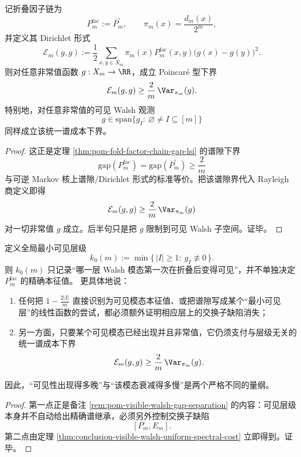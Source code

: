 \begin{theorem}[可见模态的统一谱成本下界]\label{thm:conclusion-visible-walsh-uniform-spectral-cost}
记折叠因子链为
\[
P_m^{\mathrm{fac}}:=\overline P_m^\square,
\qquad
\pi_m(x)=\frac{d_m(x)}{2^m},
\]
并定义其 Dirichlet 形式
\[
\mathcal E_m(g,g)
:=
\frac12\sum_{x,y\in X_m}\pi_m(x)P_m^{\mathrm{fac}}(x,y)\bigl(g(x)-g(y)\bigr)^2.
\]
则对任意非常值函数 \(g:X_m\to\RR\)，成立 Poincar\'e 型下界
\[
\mathcal E_m(g,g)\ge \frac{2}{m}\,\Var_{\pi_m}(g).
\]
特别地，对任意非常值的可见 Walsh 观测
\[
g\in \mathrm{span}\{g_I:\ \varnothing\neq I\subseteq[m]\}
\]
同样成立该统一谱成本下界。
\end{theorem}

\begin{proof}
这正是定理 \ref{thm:pom-fold-factor-chain-gap-lsi} 的谱隙下界
\[
\mathrm{gap}(P_m^{\mathrm{fac}})=\mathrm{gap}(\overline P_m^\square)\ge \frac{2}{m}
\]
与可逆 Markov 核上谱隙/Dirichlet 形式的标准等价。把该谱隙界代入 Rayleigh 商定义即得
\[
\mathcal E_m(g,g)\ge \frac{2}{m}\,\Var_{\pi_m}(g)
\]
对一切非常值 \(g\) 成立。后半句只是把 \(g\) 限制到可见 Walsh 子空间。证毕。
\end{proof}

\begin{corollary}[可见层级与弛豫速度的严格分裂]\label{cor:conclusion-visible-level-relaxation-splitting}
定义全局最小可见层级
\[
k_0(m):=\min\{\,|I|\ge 1:\ g_I\not\equiv 0\,\}.
\]
则 \(k_0(m)\) 只记录“哪一层 Walsh 模态第一次在折叠后变得可见”，并不单独决定 \(P_m^{\mathrm{fac}}\) 的精确本征值。
更具体地说：
\begin{enumerate}
  \item 任何把
  \(
  1-\frac{2|I|}{m}
  \)
  直接识别为可见模态本征值、或把谱隙写成某个“最小可见层”的线性函数的尝试，都必须额外证明相应层上的交换子缺陷消失；
  \item 另一方面，只要某个可见模态已经出现并且非常值，它仍须支付与层级无关的统一谱成本下界
  \[
  \mathcal E_m(g,g)\ge \frac{2}{m}\,\Var_{\pi_m}(g).
  \]
\end{enumerate}
因此，“可见性出现得多晚”与“该模态衰减得多慢”是两个严格不同的量纲。
\end{corollary}

\begin{proof}
第一点正是备注 \ref{rem:pom-visible-walsh-gap-separation} 的内容：可见层级本身并不自动给出精确谱继承，必须另外控制交换子缺陷
\[
[P_m^\square,E_m].
\]
第二点由定理 \ref{thm:conclusion-visible-walsh-uniform-spectral-cost} 立即得到。证毕。
\end{proof}

